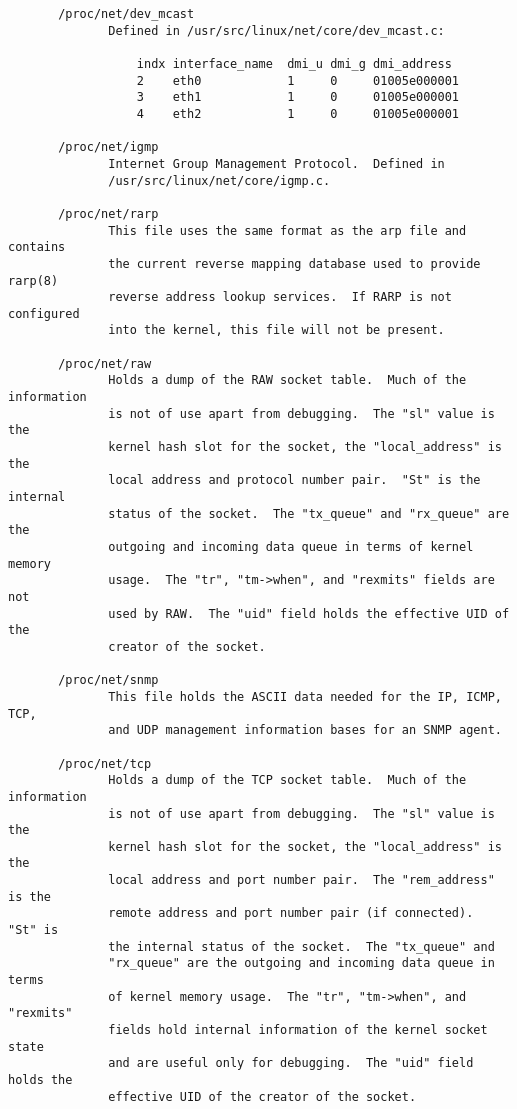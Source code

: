 \documentclass[]{article}
\begin{document}
\begin{verbatim}
       /proc/net/dev_mcast
              Defined in /usr/src/linux/net/core/dev_mcast.c:

                  indx interface_name  dmi_u dmi_g dmi_address
                  2    eth0            1     0     01005e000001
                  3    eth1            1     0     01005e000001
                  4    eth2            1     0     01005e000001

       /proc/net/igmp
              Internet Group Management Protocol.  Defined in
              /usr/src/linux/net/core/igmp.c.

       /proc/net/rarp
              This file uses the same format as the arp file and contains
              the current reverse mapping database used to provide rarp(8)
              reverse address lookup services.  If RARP is not configured
              into the kernel, this file will not be present.

       /proc/net/raw
              Holds a dump of the RAW socket table.  Much of the information
              is not of use apart from debugging.  The "sl" value is the
              kernel hash slot for the socket, the "local_address" is the
              local address and protocol number pair.  "St" is the internal
              status of the socket.  The "tx_queue" and "rx_queue" are the
              outgoing and incoming data queue in terms of kernel memory
              usage.  The "tr", "tm->when", and "rexmits" fields are not
              used by RAW.  The "uid" field holds the effective UID of the
              creator of the socket.

       /proc/net/snmp
              This file holds the ASCII data needed for the IP, ICMP, TCP,
              and UDP management information bases for an SNMP agent.

       /proc/net/tcp
              Holds a dump of the TCP socket table.  Much of the information
              is not of use apart from debugging.  The "sl" value is the
              kernel hash slot for the socket, the "local_address" is the
              local address and port number pair.  The "rem_address" is the
              remote address and port number pair (if connected).  "St" is
              the internal status of the socket.  The "tx_queue" and
              "rx_queue" are the outgoing and incoming data queue in terms
              of kernel memory usage.  The "tr", "tm->when", and "rexmits"
              fields hold internal information of the kernel socket state
              and are useful only for debugging.  The "uid" field holds the
              effective UID of the creator of the socket.


\end{verbatim}
\end{document}
